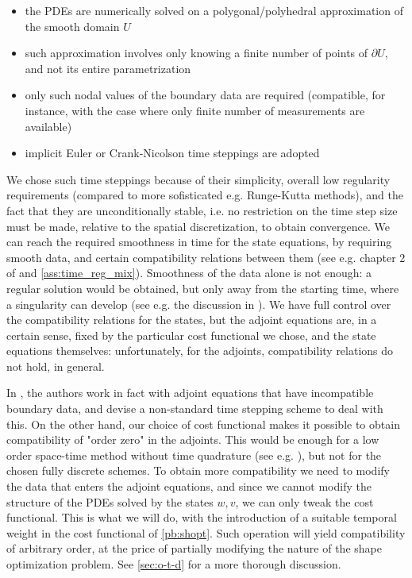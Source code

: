 \documentclass[english,a4paper,9pt,oneside]{scrbook}	%
\theoremstyle{break}
\theoremstyle{remark}
\begin{document}
\begin{itemize}
	\item the PDEs are numerically solved on a polygonal/polyhedral approximation of the smooth domain $U$
	\item such approximation involves only knowing a finite number of points of $\partial U$, and not its entire parametrization
	\item only such nodal values of the boundary data are required (compatible, for instance, with the case where only finite number of measurements are available)
	\item implicit Euler or Crank-Nicolson time steppings are adopted
\end{itemize}

We chose such time steppings because of their simplicity, overall low regularity requirements (compared to more sofisticated e.g. Runge-Kutta methods), and the fact that they are unconditionally stable, i.e. no restriction on the time step size must be made, relative to the spatial discretization, to obtain convergence. 
We can reach the required smoothness in time for the state equations, by requiring smooth data, and certain compatibility relations between them (see e.g. chapter 2 of \cite{lions} and \cref{ass:time_reg_mix}). Smoothness of the data alone is not enough: a regular solution would be obtained, but only away from the starting time, where a singularity can develop (see e.g. the discussion in \cite{harbrecht}). We have full control over the compatibility relations for the states, but the adjoint equations are, in a certain sense, fixed by the particular cost functional we chose, and the state equations themselves: unfortunately, for the adjoints, compatibility relations do not hold, in general.

In \cite{harbrecht}, the authors work in fact with adjoint equations that have incompatible boundary data, and devise a non-standard time stepping scheme to deal with this. On the other hand, our choice of cost functional makes it possible to obtain compatibility of "order zero" in the adjoints. This would be enough for a low order space-time method without time quadrature (see e.g. \cite{vexler}), but not for the chosen fully discrete schemes. To obtain more compatibility we need to modify the data that enters the adjoint equations, and since we cannot modify the structure of the PDEs solved by the states $w,v$, we can only tweak the cost functional. This is what we will do, with the introduction of a suitable temporal weight in the cost functional of \cref{pb:shopt}. Such operation will yield compatibility of arbitrary order, at the price of partially modifying the nature of the shape optimization problem. See \cref{sec:o-t-d} for a more thorough discussion.
\end{document}
